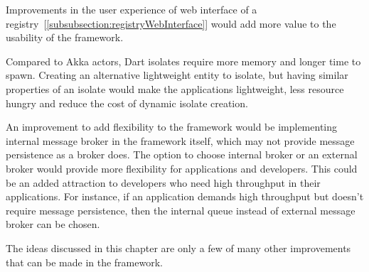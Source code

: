   Improvements in the user experience of web interface of a registry~[\autoref{subsubsection:registryWebInterface}] would add more value to the usability of the framework.

  Compared to Akka actors, Dart isolates require more memory and longer time to spawn. Creating an alternative lightweight entity to isolate, but having similar properties of an isolate would make the applications lightweight, less resource hungry and reduce the cost of dynamic isolate creation.

  An improvement to add flexibility to the framework would be implementing internal message broker in the framework itself, which may not provide message persistence as a broker does. The option to choose internal broker or an external broker would provide more flexibility for applications and developers. This could be an added attraction to developers who need high throughput in their applications. For instance, if an application demands high throughput but doesn't require message persistence, then the internal queue instead of external message broker can be chosen.

  The ideas discussed in this chapter are only a few of many other improvements that can be made in the framework.
